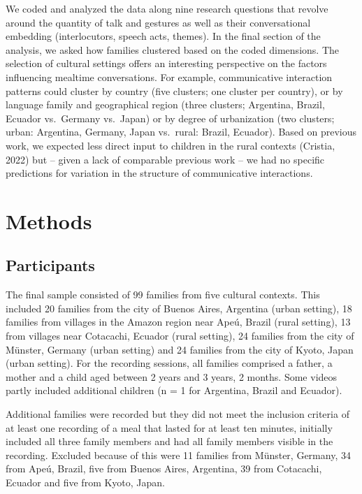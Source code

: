 \documentclass[
  man,floatsintext]{apa6}
\begin{document}
We coded and analyzed the data along nine research questions that revolve around the quantity of talk and gestures as well as their conversational embedding (interlocutors, speech acts, themes). In the final section of the analysis, we asked how families clustered based on the coded dimensions. The selection of cultural settings offers an interesting perspective on the factors influencing mealtime conversations. For example, communicative interaction patterns could cluster by country (five clusters; one cluster per country), or by language family and geographical region (three clusters; Argentina, Brazil, Ecuador vs.~Germany vs.~Japan) or by degree of urbanization (two clusters; urban: Argentina, Germany, Japan vs.~rural: Brazil, Ecuador). Based on previous work, we expected less direct input to children in the rural contexts (Cristia, 2022) but -- given a lack of comparable previous work -- we had no specific predictions for variation in the structure of communicative interactions.

\hypertarget{methods}{%
\section{Methods}\label{methods}}

\hypertarget{participants}{%
\subsection{Participants}\label{participants}}

The final sample consisted of 99 families from five cultural contexts. This included 20 families from the city of Buenos Aires, Argentina (urban setting), 18 families from villages in the Amazon region near Apeú, Brazil (rural setting), 13 from villages near Cotacachi, Ecuador (rural setting), 24 families from the city of Münster, Germany (urban setting) and 24 families from the city of Kyoto, Japan (urban setting). For the recording sessions, all families comprised a father, a mother and a child aged between 2 years and 3 years, 2 months. Some videos partly included additional children (n = 1 for Argentina, Brazil and Ecuador).

Additional families were recorded but they did not meet the inclusion criteria of at least one recording of a meal that lasted for at least ten minutes, initially included all three family members and had all family members visible in the recording. Excluded because of this were 11 families from Münster, Germany, 34 from Apeú, Brazil, five from Buenos Aires, Argentina, 39 from Cotacachi, Ecuador and five from Kyoto, Japan.
\end{document}
